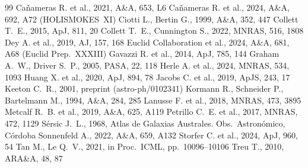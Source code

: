 \documentclass[fleqn,usenatbib]{mnras}
\begin{document}
\begin{thebibliography}{99}
 Ca\~{n}ameras R. et al., 2021, A\&A, 653, L6
 Ca\~{n}ameras R. et al., 2024, A\&A, 692, A72 (HOLISMOKES~XI)
 Ciotti L., Bertin G., 1999, A\&A, 352, 447
 Collett T.~E., 2015, ApJ, 811, 20
 Collett T.~E., Cunnington S., 2022, MNRAS, 516, 1808
 Dey A. et al., 2019, AJ, 157, 168
 Euclid Collaboration et al., 2024, A\&A, 681, A68 (Euclid Prep.~XXXIII)
 Gavazzi R. et al., 2014, ApJ, 785, 144
 Graham A.~W., Driver S.~P., 2005, PASA, 22, 118
 Herle A. et al., 2024, MNRAS, 534, 1093
 Huang X. et al., 2020, ApJ, 894, 78
 Jacobs C. et al., 2019, ApJS, 243, 17
 Keeton C.~R., 2001, preprint (astro-ph/0102341)
 Kormann R., Schneider P., Bartelmann M., 1994, A\&A, 284, 285
 Lanusse F. et al., 2018, MNRAS, 473, 3895
 Metcalf R.~B. et al., 2019, A\&A, 625, A119
 Petrillo C.~E. et al., 2017, MNRAS, 472, 1129
 S\'{e}rsic J.~L., 1968, Atlas de Galaxias Australes. Obs.\ Astron\'{o}mico, C\'{o}rdoba
 Sonnenfeld A., 2022, A\&A, 659, A132
 Storfer C. et al., 2024, ApJ, 960, 54
 Tan M., Le Q.~V., 2021, in Proc.\ ICML, pp.\ 10096--10106
 Treu T., 2010, ARA\&A, 48, 87
\end{thebibliography}
\end{document}
